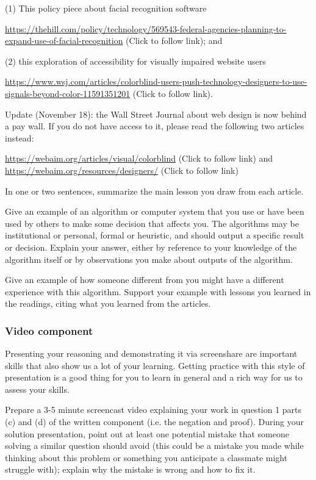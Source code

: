 \begin{enumerate}
    (1) This policy piece about facial recognition software

    {\tiny \url{https://thehill.com/policy/technology/569543-federal-agencies-planning-to-expand-use-of-facial-recognition}}
    (Click to follow link); and 

    (2) this exploration of accessibility for visually impaired website users
    
    {\tiny \url{https://www.wsj.com/articles/colorblind-users-push-technology-designers-to-use-signals-beyond-color-11591351201}}
    (Click to follow link).

    Update (November 18): the Wall Street Journal about web design is now behind a pay wall. If you 
    do not have access to it, please read the following two articles instead:

    {\tiny \url{https://webaim.org/articles/visual/colorblind}}
    (Click to follow link) and
    {\tiny \url{https://webaim.org/resources/designers/}}
    (Click to follow link)


    In one or two sentences, summarize the main lesson you draw from each article.

    Give an example of an algorithm or computer system that you use or have been used by others to 
    make some decision that affects you. The algorithms may be institutional or personal, formal or 
    heuristic, and should output a 
    specific result or decision. Explain your answer, either by reference to your knowledge of 
    the algorithm itself or by observations you make 
    about outputs of the algorithm.

    Give an example of how someone different from you might have a different experience 
    with this algorithm. Support your example with lessons you learned in the 
    readings, citing what you learned from the articles.
\end{enumerate}

\subsubsection*{Video component}
Presenting your reasoning and demonstrating it via screenshare are important skills that 
also show us a lot of your learning. Getting practice with this style of presentation 
is a good thing for you to learn in general and a rich way for us to assess your skills. 

Prepare a 3-5 minute screencast video explaining your work in question 1 parts (c) and (d)
of the written component (i.e. the negation and proof).
During your solution presentation, point out at least one potential mistake that someone 
solving a similar question should avoid (this could be a mistake you made while thinking 
about this problem or something you anticipate a classmate might struggle with); 
explain why the mistake is wrong and how to fix it. 

